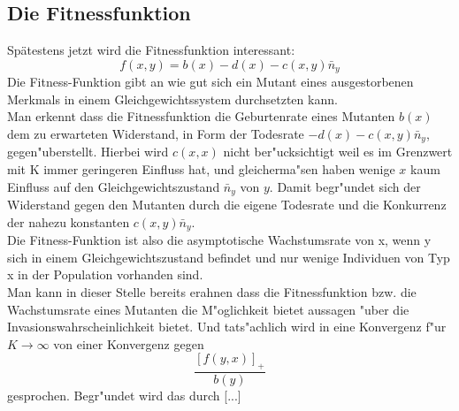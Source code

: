 \documentclass[11pt, a4paper, german]{article}
\begin{document}
	\subsection{Die Fitnessfunktion}
	Spätestens jetzt wird die Fitnessfunktion interessant:
	\[ f(x,y) = b(x) - d(x) - c(x,y)\bar{n}_y \]
	Die Fitness-Funktion gibt an wie gut sich ein Mutant eines ausgestorbenen Merkmals in einem Gleichgewichtssystem durchsetzten kann. \\
	Man erkennt dass die Fitnessfunktion die Geburtenrate eines Mutanten $ b(x) $ dem zu erwarteten Widerstand, in Form der Todesrate $ - d(x) - c(x,y)\bar{n}_y $, gegen"uberstellt. Hierbei wird $ c(x,x) $ nicht ber"ucksichtigt weil es im Grenzwert mit K immer geringeren Einfluss hat, und gleicherma"sen haben wenige $ x  $ kaum Einfluss auf den Gleichgewichtszustand $ \bar{n}_y $ von $ y $. Damit begr"undet sich der Widerstand gegen den Mutanten durch die eigene Todesrate und die Konkurrenz der nahezu konstanten $ c(x,y)\bar{n}_y $. \\
	Die Fitness-Funktion ist also die asymptotische Wachstumsrate von x, wenn y sich in einem Gleichgewichtszustand befindet und nur wenige Individuen von Typ x in der Population vorhanden sind.\\
	Man kann in dieser Stelle bereits erahnen dass die Fitnessfunktion bzw. die Wachstumsrate eines Mutanten die M"oglichkeit bietet aussagen "uber die Invasionswahrscheinlichkeit bietet. Und tats"achlich wird in \cite{Champagnat20061127} eine Konvergenz f"ur $ K \to \infty $ von einer Konvergenz gegen 
	\[ \frac{\left[ f(y,x)\right]_+ }{b(y)} \]
	gesprochen. Begr"undet wird das durch [...]\\
	
\end{document}
